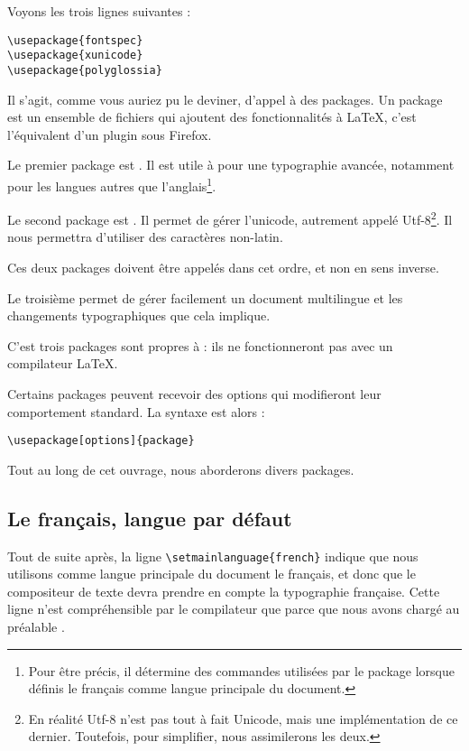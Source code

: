 Voyons les trois lignes suivantes : 
\begin{verbatim}
\usepackage{fontspec}
\usepackage{xunicode}
\usepackage{polyglossia}
\end{verbatim}

Il s'agit, comme vous auriez pu le deviner, d'appel à des packages. Un package est un ensemble de fichiers qui ajoutent des fonctionnalités à \LaTeX, c'est l'équivalent d'un plugin sous Firefox. 

Le premier package est . Il est utile à \XeLaTeX  pour une typographie avancée, notamment pour les langues autres que l'anglais\footnote{Pour être précis, il détermine des commandes utilisées par le package  lorsque définis le fran\c cais comme langue principale du document.}. 

Le second package est . Il permet de gérer l'unicode, autrement appelé Utf-8\footnote{En réalité Utf-8 n'est pas tout à fait Unicode, mais une implémentation de ce dernier. Toutefois, pour simplifier, nous assimilerons les deux.}. Il nous permettra d'utiliser des caractères non-latin.

\begin{attention}
Ces deux packages doivent être appelés dans cet ordre, et non en sens inverse.
\end{attention}

Le troisième permet de gérer facilement un document multilingue et les changements typographiques que cela implique.

C'est trois packages sont propres à \XeLaTeX  : ils ne fonctionneront pas avec un compilateur \LaTeX.

Certains packages peuvent recevoir des options qui modifieront leur comportement standard. La syntaxe est alors :

\verb|\usepackage[options]{package}|

Tout au long de cet ouvrage, nous aborderons divers packages.

\subsection{Le fran\c cais, langue par défaut\label{french}}

Tout de suite après, la ligne \verb|\setmainlanguage{french}| indique que nous utilisons comme langue principale du document le fran\c cais, et donc que le compositeur de texte devra prendre en compte la typographie fran\c caise. Cette ligne n'est compréhensible par le compilateur que parce que nous avons chargé au préalable .

